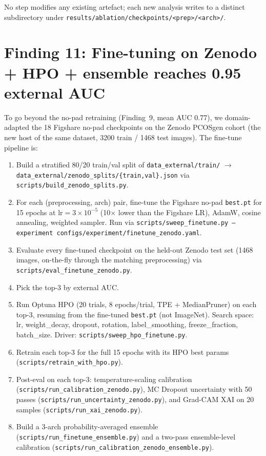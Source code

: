 \documentclass[11pt]{article}
\begin{document}
No step modifies any existing artefact; each new analysis writes to a
distinct subdirectory under \texttt{results/ablation/checkpoints/<prep>/<arch>/}.

\section{Finding 11: Fine-tuning on Zenodo + HPO + ensemble reaches 0.95 external AUC}

To go beyond the no-pad retraining (Finding~9, mean AUC 0.77), we
domain-adapted the 18 Figshare no-pad checkpoints on the Zenodo PCOSgen
cohort (the new host of the same dataset, 3200 train / 1468 test images).
The fine-tune pipeline is:

\begin{enumerate}
  \item Build a stratified 80/20 train/val split of
        \texttt{data\_external/train/} $\rightarrow$
        \texttt{data\_external/zenodo\_splits/\{train,val\}.json} via
        \texttt{scripts/build\_zenodo\_splits.py}.
  \item For each (preprocessing, arch) pair, fine-tune the Figshare
        no-pad \texttt{best.pt} for 15 epochs at $\mathrm{lr}=3\times10^{-5}$
        (10$\times$ lower than the Figshare LR), AdamW, cosine annealing,
        weighted sampler. Run via
        \texttt{scripts/sweep\_finetune.py --experiment
        configs/experiment/finetune\_zenodo.yaml}.
  \item Evaluate every fine-tuned checkpoint on the held-out Zenodo test
        set (1468 images, on-the-fly through the matching preprocessing)
        via \texttt{scripts/eval\_finetune\_zenodo.py}.
  \item Pick the top-3 by external AUC.
  \item Run Optuna HPO (20 trials, 8 epochs/trial, TPE + MedianPruner)
        on each top-3, resuming from the fine-tuned \texttt{best.pt}
        (not ImageNet). Search space: lr, weight\_decay, dropout,
        rotation, label\_smoothing, freeze\_fraction, batch\_size. Driver:
        \texttt{scripts/sweep\_hpo\_finetune.py}.
  \item Retrain each top-3 for the full 15 epochs with its HPO best
        params (\texttt{scripts/retrain\_with\_hpo.py}).
  \item Post-eval on each top-3: temperature-scaling calibration
        (\texttt{scripts/run\_calibration\_zenodo.py}), MC Dropout
        uncertainty with 50 passes
        (\texttt{scripts/run\_uncertainty\_zenodo.py}), and Grad-CAM XAI
        on 20 samples (\texttt{scripts/run\_xai\_zenodo.py}).
  \item Build a 3-arch probability-averaged ensemble
        (\texttt{scripts/run\_finetune\_ensemble.py}) and a two-pass
        ensemble-level calibration
        (\texttt{scripts/run\_calibration\_zenodo\_ensemble.py}).
\end{enumerate}
\end{document}
